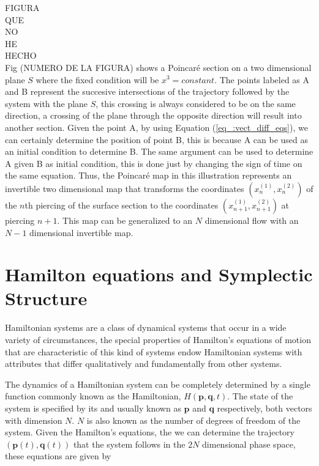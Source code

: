FIGURA\\
QUE\\
NO\\
HE\\
HECHO\\

Fig (NUMERO DE LA FIGURA) shows a Poincaré section on a two dimensional plane $S$ where the fixed condition will be $x^{3}=constant$. The points labeled as A and B represent the succesive intersections of the trajectory followed by the system with the plane $S$, this crossing is always considered to be on the same direction, a crossing of the plane through the opposite direction will result into another section. Given the point A, by using Equation (\ref{eq_:vect_diff_eqs}), we can certainly determine the position of point B, this is because A can be used as an initial condition to determine B. The same argument can be used to determine A given B as initial condition, this is done just by changing the sign of time on the same equation. Thus, the Poincaré map in this illustration represents an invertible two dimensional map that transforms the coordinates $(x_n^{(1)},x_n^{(2)})$ of the $n$th piercing of the surface section to the coordinates $(x_{n+1}^{(1)},x_{n+1}^{(2)})$ at piercing $n+1$. This map can be generalized to an $N$ dimensional flow with an $N-1$ dimensional invertible map.

\section{Hamilton equations and Symplectic Structure}

Hamiltonian systems are a class of dynamical systems that occur in a wide variety of circumstances, the special properties of Hamilton's equations of motion that are characteristic of this kind of systems endow Hamiltonian systems with attributes that differ qualitatively and fundamentally from other systems.\par 

The dynamics of a Hamiltonian system can be completely determined by a single function commonly known as the Hamiltonian, $H(\bm{p},\bm{q},t)$. The state of the system is specified by its  and  usually known as $\bm{p}$ and $\bm{q}$ respectively, both vectors with dimension $N$. $N$ is also known as the number of degrees of freedom of the system. Given the Hamilton's equations, the we can determine the trajectory  $(\bm{p}(t),\bm{q}(t))$ that the system follows in the $2N$ dimensional phase space, these equations are given by

